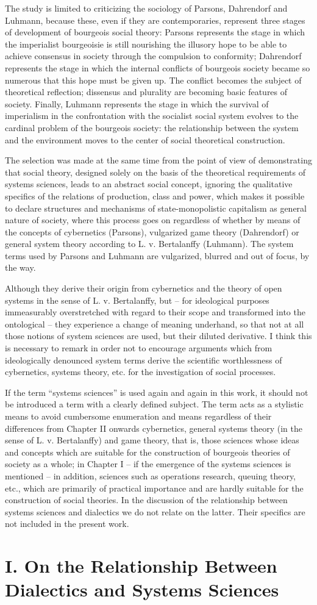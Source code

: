 \documentclass[11pt,a4paper]{article}
\begin{document}
The study is limited to criticizing the sociology of Parsons, Dahrendorf and
Luhmann, because these, even if they are contemporaries, represent three
stages of development of bourgeois social theory: Parsons represents the stage
in which the imperialist bourgeoisie is still nourishing the illusory hope to
be able to achieve consensus in society through the compulsion to conformity;
Dahrendorf represents the stage in which the internal conflicts of bourgeois
society became so numerous that this hope must be given up. The conflict
becomes the subject of theoretical reflection; dissensus and plurality are
becoming basic features of society.  Finally, Luhmann represents the stage in
which the survival of imperialism in the confrontation with the socialist
social system evolves to the cardinal problem of the bourgeois society: the
relationship between the system and the environment moves to the center of 
social theoretical construction.

The selection was made at the same time from the point of view of
demonstrating that social theory, designed solely on the basis of the
theoretical requirements of systems sciences, leads to an abstract social
concept, ignoring the qualitative specifics of the relations of production,
class and power, which makes it possible to declare structures and mechanisms
of state-monopolistic capitalism as general nature of society, where this
process goes on regardless of whether by means of the concepts of cybernetics
(Parsons), vulgarized game theory (Dahrendorf) or general system theory
according to L. v. Bertalanffy (Luhmann). The system terms used by Parsons and
Luhmann are vulgarized, blurred and out of focus, by the way.

Although they derive their origin from cybernetics and the theory of open
systems in the sense of L. v. Bertalanffy, but -- for ideological purposes
immeasurably overstretched with regard to their scope and transformed into the
ontological -- they experience a change of meaning underhand, so that not at
all those notions of system sciences are used, but their diluted derivative. I
think this is necessary to remark in order not to encourage arguments which
from ideologically denounced system terms derive the scientific worthlessness
of cybernetics, systems theory, etc. for the investigation of social
processes.

If the term \enquote{systems sciences} is used again and again in this work,
it should not be introduced a term with a clearly defined subject. The term
acts as a stylistic means to avoid cumbersome enumeration and means regardless
of their differences from Chapter II onwards cybernetics, general systems
theory (in the sense of L. v. Bertalanffy) and game theory, that is, those
sciences whose ideas and concepts which are suitable for the construction of
bourgeois theories of society as a whole; in Chapter I -- if the emergence of
the systems sciences is mentioned -- in addition, sciences such as operations
research, queuing theory, etc., which are primarily of practical importance
and are hardly suitable for the construction of social theories. In the
discussion of the relationship between systems sciences and dialectics we do
not relate on the latter.  Their specifics are not included in the present
work.

\section*{I. On the Relationship Between Dialectics and Systems Sciences}


\end{document}
